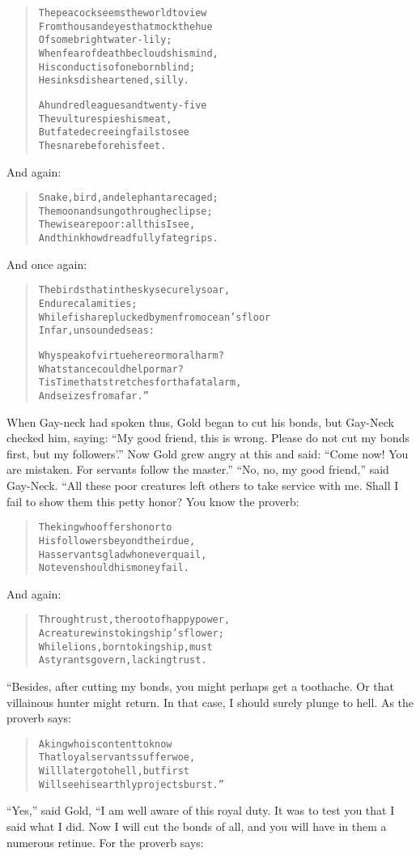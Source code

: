 \documentclass[article, twoside, 14pt]{memoir}
\renewenvironment{verbatim}{%
\begin{quote}%
\vskip -10pt%
\begin{alltt}\normalfont\large}{\end{alltt}%
\end{quote}%
\vskip -10pt
} %
\begin{document}
\begin{verbatim}
The peacock seems the world to view
From thousand eyes that mock the hue
    Of some bright water-lily;
When fear of death beclouds his mind,
His conduct is of one born blind;
    He sinks disheartened, silly.

A hundred leagues and twenty-five
    The vulture spies his meat,
But{\textemdash}fate decreeing{\textemdash}fails to see
    The snare before his feet.
\end{verbatim}
And again:

\begin{verbatim}
Snake, bird, and elephant are caged;
    The moon and sun go through eclipse;
The wise are poor: all this I see,
    And think how dreadfully fate grips.
\end{verbatim}
And once again:

\begin{verbatim}
The birds that in the sky securely soar,
    Endure calamities;
While fish are plucked by men from ocean's floor
    In far, unsounded seas:

Why speak of virtue here or moral harm?
What stance could help or mar?
Tis Time that stretches forth a fatal arm,
And seizes from afar.”
\end{verbatim}
When Gay-neck had spoken thus, Gold began to cut his bonds, but
Gay-Neck checked him, saying:
``My good friend, this is wrong. Please do not cut my bonds first, but my followers'.''
Now Gold grew angry at this and said:
``Come now! You are mistaken. For servants follow the master.''
``No, no, my good friend,'' said Gay-Neck. “All these poor
creatures left others to take service with me. Shall I fail to show
them this petty honor? You know the proverb:

\begin{verbatim}
The king who offers honor to
His followers beyond their due,
Has servants glad who never quail,
Not even should his money fail.
\end{verbatim}
And again:

\begin{verbatim}
Through trust, the root of happy power,
A creature wins to kingship's flower;
While lions, born to kingship, must
As tyrants govern, lacking trust.
\end{verbatim}
“Besides, after cutting my bonds, you might perhaps get a
toothache. Or that villainous hunter might return. In that case, I
should surely plunge to hell. As the proverb says:

\begin{verbatim}
A king who is content to know
That loyal servants suffer woe,
Will later go to hell, but first
Will see his earthly projects burst.”
\end{verbatim}
``Yes,'' said Gold, “I am well aware of this royal duty. It
was to test you that I said what I did. Now I will cut the bonds of
all, and you will have in them a numerous retinue. For the proverb
says:
\end{document}
